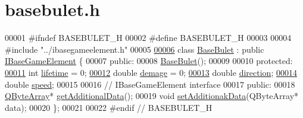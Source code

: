 \hypertarget{a00035_source}{}\section{basebulet.\+h}
\label{a00035_source}

\begin{DoxyCode}
00001 \textcolor{preprocessor}{#}\textcolor{preprocessor}{ifndef} \textcolor{preprocessor}{BASEBULET\_H}
00002 \textcolor{preprocessor}{#}\textcolor{preprocessor}{define} \textcolor{preprocessor}{BASEBULET\_H}
00003 
00004 \textcolor{preprocessor}{#}\textcolor{preprocessor}{include} \textcolor{preprocessor}{"../ibasegameelement.h"}
00005 
\hyperlink{a00153}{00006} \textcolor{keyword}{class} \hyperlink{a00153}{BaseBulet} : \textcolor{keyword}{public} \hyperlink{a00137_ae2be75da1a2a9edfabe993770e24654a}{IBaseGameElement} \{
00007  \textcolor{keyword}{public}:
00008   \hyperlink{a00153_abdfda473d6ddd2a2fb35783dfa5ef836}{BaseBulet}();
00009 
00010  \textcolor{keyword}{protected}:
\hyperlink{a00153_a9ad5db3e6e5d664e1ca4390285d43782}{00011}   \textcolor{keywordtype}{int} \hyperlink{a00153_a9ad5db3e6e5d664e1ca4390285d43782}{lifetime} = 0;
\hyperlink{a00153_af945a06780b38cebab807ff1ad63eb7a}{00012}   \textcolor{keywordtype}{double} \hyperlink{a00153_af945a06780b38cebab807ff1ad63eb7a}{demage} = 0;
\hyperlink{a00153_a16b71d8fb0386d4b048ca96c8c806896}{00013}   \textcolor{keywordtype}{double} \hyperlink{a00153_a16b71d8fb0386d4b048ca96c8c806896}{direction};
\hyperlink{a00153_ad90bbbab47b5e3b8fa1a683210d026d7}{00014}   \textcolor{keywordtype}{double} \hyperlink{a00153_ad90bbbab47b5e3b8fa1a683210d026d7}{speed};
00015 
00016   \textcolor{comment}{// IBaseGameElement interface}
00017  \textcolor{keyword}{public}:
00018   \hyperlink{a00153_a307a62b59328f9e2a0530f559aba0dcb}{QByteArray}* \hyperlink{a00153_a307a62b59328f9e2a0530f559aba0dcb}{getAdditionalData}();
00019   \textcolor{keywordtype}{void} \hyperlink{a00153_ae97774994602a89562688f97339b9eb3}{setAdditionakData}(QByteArray* data);
00020 \};
00021 
00022 \textcolor{preprocessor}{#}\textcolor{preprocessor}{endif}  \textcolor{comment}{// BASEBULET\_H}
\end{DoxyCode}
